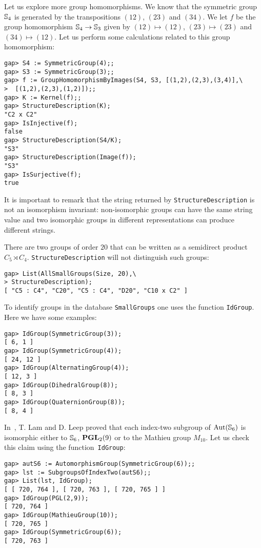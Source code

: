 \begin{example}
Let us explore more group homomorphisms. We know that the symmetric group $\mathbb{S}_4$
is generated by the transpositions $(12)$, $(23)$ and $(34)$. We let $f$ be the
group homomorphism $\mathbb{S}_4\to\mathbb{S}_3$ given by $(12)\mapsto (12)$, $(23)\mapsto
(23)$ and $(34)\mapsto(12)$. 
Let us perform some calculations related to this
group homomorphism:
\begin{lstlisting}
gap> S4 := SymmetricGroup(4);;
gap> S3 := SymmetricGroup(3);;
gap> f := GroupHomomorphismByImages(S4, S3, [(1,2),(2,3),(3,4)],\
>  [(1,2),(2,3),(1,2)]);;
gap> K := Kernel(f);;
gap> StructureDescription(K);
"C2 x C2"
gap> IsInjective(f);
false
gap> StructureDescription(S4/K);
"S3"
gap> StructureDescription(Image(f));
"S3"
gap> IsSurjective(f);
true
\end{lstlisting}
\end{example}

It is important to remark that the string
returned by \lstinline{StructureDescription} is not an isomorphism invariant:
non-isomorphic groups can have the same string value and two isomorphic groups
in different representations can produce different strings. 

\begin{example}
There are two groups of order $20$ that can be written as 
a semidirect product $C_5\rtimes C_4$. 
\lstinline{StructureDescription} will not distinguish such groups:
\begin{lstlisting}
gap> List(AllSmallGroups(Size, 20),\
> StructureDescription);
[ "C5 : C4", "C20", "C5 : C4", "D20", "C10 x C2" ]
\end{lstlisting}
To identify groups in the database \lstinline{SmallGroups} one uses the
function \lstinline{IdGroup}. Here we have some examples:
\begin{lstlisting}
gap> IdGroup(SymmetricGroup(3));
[ 6, 1 ]
gap> IdGroup(SymmetricGroup(4));
[ 24, 12 ]
gap> IdGroup(AlternatingGroup(4));
[ 12, 3 ]
gap> IdGroup(DihedralGroup(8));
[ 8, 3 ]
gap> IdGroup(QuaternionGroup(8));
[ 8, 4 ]
\end{lstlisting}
\end{example}

\begin{example}
	In~\cite{MR1240362}, T. Lam and D. Leep proved that each index-two subgroup of
	$\operatorname{Aut}(\mathbb{S}_6)$ is isomorphic either to $\mathbb{S}_6$, $\mathbf{PGL}_2(9)$ or to the Mathieu group
	$M_{10}$. Let us check this claim using the function~\lstinline{IdGroup}:
	\begin{lstlisting}
gap> autS6 := AutomorphismGroup(SymmetricGroup(6));;
gap> lst := SubgroupsOfIndexTwo(autS6);;
gap> List(lst, IdGroup);
[ [ 720, 764 ], [ 720, 763 ], [ 720, 765 ] ]
gap> IdGroup(PGL(2,9));
[ 720, 764 ]
gap> IdGroup(MathieuGroup(10));
[ 720, 765 ]
gap> IdGroup(SymmetricGroup(6));
[ 720, 763 ]
\end{lstlisting}
\end{example}


